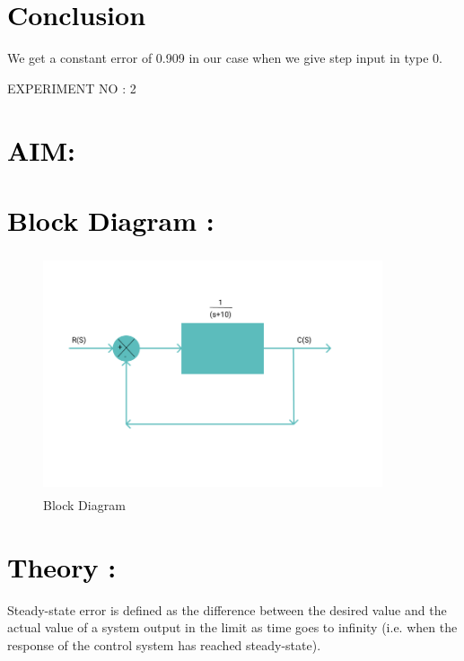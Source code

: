 \documentclass[12pt]{article}
\begin{document}
\section*{\textcolor{black}{Conclusion}}
We get a constant error of 0.909 in our case when we give step input in type 0.
 \pagebreak
 
\begin{center}
    \LARGE {EXPERIMENT NO : 2}
             
\end{center}

\section*{\textcolor{black}{AIM: }}

\section*{\textcolor{black}{Block Diagram :}}
\begin{figure}[!hth]
        \centering
        \includegraphics[width =10cm, height = 7cm]{images/exp2.png}
        \caption{Block Diagram}
        \label{Graph}
\end{figure}

\section*{\textcolor{black}{Theory :}}
Steady-state error is defined as the difference between the desired value and the actual value of a system output in the limit as time goes to infinity (i.e. when the response of the control system has reached steady-state).\par
\end{document}
